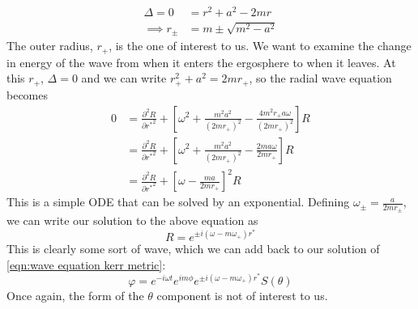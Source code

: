\documentclass[11pt]{article}
\numberwithin{equation}{section}
\numberwithin{figure}{section}
\numberwithin{table}{section}
\begin{document}
\begin{align*}
    \Delta=0&=r^2+a^2-2mr\\
    \implies r_\pm&=m\pm\sqrt{m^2-a^2}
\end{align*}
The outer radius, $r_+$, is the one of interest to us. We want to examine the change in energy of the wave from when it enters the ergosphere to when it leaves. At this $r_+$, $\Delta=0$ and we can write $r_+^2+a^2=2mr_+$, so the radial wave equation becomes
\begin{align*}    
    0&=\frac{\partial^2 R}{\partial {r^*}^2}+\left[\omega^2+\frac{m^2a^2}{(2mr_+)^2}-\frac{4m^2r_+a\omega}{(2mr_+)^2}\right]R\\
    &=\frac{\partial^2 R}{\partial {r^*}^2}+\left[\omega^2+\frac{m^2a^2}{(2mr_+)^2}-\frac{2ma\omega}{2mr_+}\right]R\\
    &=\frac{\partial^2 R}{\partial {r^*}^2}+\left[\omega-\frac{ma}{2mr_+}\right]^2R
\end{align*}
This is a simple ODE that can be solved by an exponential. Defining $\omega_\pm=\frac{a}{2mr_\pm}$, we can write our solution to the above equation as
\begin{equation}
    R=e^{\pm i(\omega-m\omega_+)r^*}
    \label{eqn:radial wave equation solution}
\end{equation}
This is clearly some sort of wave, which we can add back to our solution of \cref{eqn:wave equation kerr metric}:
\begin{equation}
    \varphi=e^{-i\omega t}e^{im\phi}e^{\pm i(\omega-m\omega_+)r^*}S(\theta)
    \label{eqn:scalar field}
\end{equation}
Once again, the form of the $\theta$ component is not of interest to us. 
\end{document}

